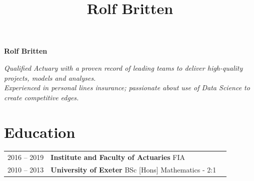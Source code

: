 \documentclass[11pt]{article}
\title{\bfseries \Huge Rolf Britten}
\date{}
\begin{document}
\vspace{-100mm}
   \begin{center}
      \Huge\textbf{Rolf Britten}\\
   \end{center}
\vspace{-5mm}

\begin{center} \emph{Qualified Actuary with a proven record of leading teams to deliver high-quality projects, models and analyses.\\Experienced in personal lines insurance; passionate about use of Data Science to create competitive edges.} \end{center}

\vspace{-7mm}

\section*{Education}
\begin{tabular}{l | l l}
2016 -- 2019 & \textbf{Institute and Faculty of Actuaries} FIA \\
2010 -- 2013 & \textbf{University of Exeter} BSc [Hons] Mathematics - 2:1\\
\end{tabular}
\end{document}
